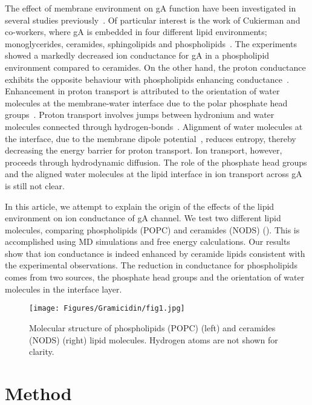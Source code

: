 The effect of membrane environment on gA function have been investigated in several studies
previously~\cite{DeGodoy2011,Wyatt2009,Qin2007,Cukierman2000,Dreyer2013}. Of particular interest 
is the work of Cukierman and co-workers, where gA is embedded in four different lipid environments; 
monoglycerides, ceramides, sphingolipids and phospholipids~\cite{DeGodoy2011}. The experiments 
showed a markedly decreased ion conductance for gA in a phospholipid environment compared to 
ceramides. On the other hand, the proton conductance exhibits the opposite behaviour with 
phospholipids enhancing conductance~\cite{Wyatt2009}. Enhancement in proton transport is attributed 
to the orientation of water molecules at the membrane-water interface due to the polar phosphate 
head groups~\cite{Qin2007}. Proton transport involves jumps between hydronium and water molecules 
connected through hydrogen-bonds~\cite{Cukierman2000}. Alignment of water molecules at the interface, 
due to the membrane dipole potential~\cite{Dreyer2013}, reduces entropy, thereby decreasing the energy 
barrier for proton transport. Ion transport, however, proceeds through hydrodynamic diffusion. The 
role of the phosphate head groups and the aligned water molecules at the lipid interface in ion 
transport across gA is still not clear.

In this article, we attempt to explain the origin of the effects of the lipid environment on ion 
conductance of gA channel. We test two different lipid molecules, comparing phospholipids (POPC) 
and ceramides (NODS) (). This is accomplished using MD simulations and free 
energy calculations. Our results show that ion conductance is indeed enhanced by ceramide lipids 
consistent with the experimental observations. The reduction in conductance for phospholipids 
comes from two sources, the phosphate head groups and the orientation of water molecules in the 
interface layer.

\begin{figure}[t!]
\centering
\texttt{[image: Figures/Gramicidin/fig1.jpg]}
\caption{Molecular structure of phospholipids (POPC) (left) and ceramides (NODS) 
         (right) lipid molecules. Hydrogen atoms are not shown for clarity.}
\label{gA:fig1}
\end{figure}

\section{Method}
